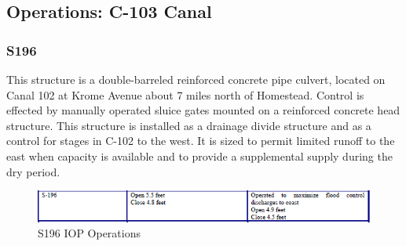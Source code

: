 \clearpage
\subsection{Operations: C-103 Canal}

\subsubsection{S196}
This structure is a double-barreled reinforced concrete pipe culvert, located on Canal 102 at Krome Avenue about 7 miles north of Homestead. Control is effected by manually operated sluice gates mounted on a reinforced concrete head structure. This structure is installed as a drainage divide structure and as a control for stages in C-102 to the west. It is sized to permit limited runoff to the east when capacity is available and to provide a supplemental supply during the dry period.


%
%

\begin{figure}[!h]
  \begin{center}
  \includegraphics[width=6.5in]{../figs/S196_IOPops.png}
  \caption{S196 IOP Operations}
  \label{fig:S196iop}
  \end{center}
\end{figure}


